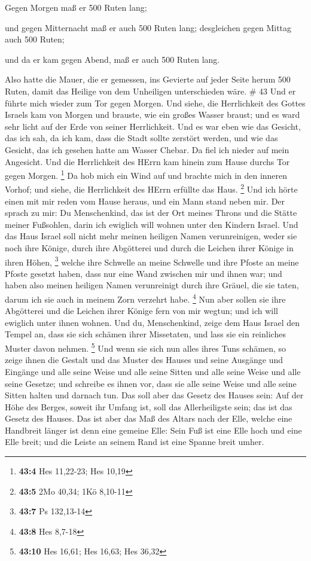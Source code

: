  Gegen Morgen maß er 500 Ruten lang;

 und gegen Mitternacht maß er auch 500 Ruten lang;
 desgleichen gegen Mittag auch 500 Ruten;

 und da er kam gegen Abend, maß er auch 500 Ruten lang.

 Also hatte die Mauer, die er gemessen, ins Gevierte auf
jeder Seite herum 500 Ruten, damit das Heilige von dem Unheiligen
unterschieden wäre. \# 43  Und er führte mich wieder zum Tor
gegen Morgen.  Und siehe, die Herrlichkeit des Gottes
Israels kam von Morgen und brauste, wie ein großes Wasser braust; und es
ward sehr licht auf der Erde von seiner Herrlichkeit.  Und
es war eben wie das Gesicht, das ich sah, da ich kam, dass die Stadt
sollte zerstört werden, und wie das Gesicht, das ich gesehen hatte am
Wasser Chebar. Da fiel ich nieder auf mein Angesicht.  Und
die Herrlichkeit des HErrn kam hinein zum Hause durchs Tor gegen Morgen.
\footnote{\textbf{43:4} Hes 11,22-23; Hes 10,19}  Da hob
mich ein Wind auf und brachte mich in den inneren Vorhof; und siehe, die
Herrlichkeit des HErrn erfüllte das Haus. \footnote{\textbf{43:5} 2Mo
  40,34; 1Kö 8,10-11}  Und ich hörte einen mit mir reden vom
Hause heraus, und ein Mann stand neben mir.  Der sprach zu
mir: Du Menschenkind, das ist der Ort meines Throns und die Stätte
meiner Fußsohlen, darin ich ewiglich will wohnen unter den Kindern
Israel. Und das Haus Israel soll nicht mehr meinen heiligen Namen
verunreinigen, weder sie noch ihre Könige, durch ihre Abgötterei und
durch die Leichen ihrer Könige in ihren Höhen, \footnote{\textbf{43:7}
  Ps 132,13-14}  welche ihre Schwelle an meine Schwelle und
ihre Pfoste an meine Pfoste gesetzt haben, dass nur eine Wand zwischen
mir und ihnen war; und haben also meinen heiligen Namen verunreinigt
durch ihre Gräuel, die sie taten, darum ich sie auch in meinem Zorn
verzehrt habe. \footnote{\textbf{43:8} Hes 8,7-18}  Nun aber
sollen sie ihre Abgötterei und die Leichen ihrer Könige fern von mir
wegtun; und ich will ewiglich unter ihnen wohnen.  Und du,
Menschenkind, zeige dem Haus Israel den Tempel an, dass sie sich schämen
ihrer Missetaten, und lass sie ein reinliches Muster davon nehmen.
\footnote{\textbf{43:10} Hes 16,61; Hes 16,63; Hes 36,32} 
Und wenn sie sich nun alles ihres Tuns schämen, so zeige ihnen die
Gestalt und das Muster des Hauses und seine Ausgänge und Eingänge und
alle seine Weise und alle seine Sitten und alle seine Weise und alle
seine Gesetze; und schreibe es ihnen vor, dass sie alle seine Weise und
alle seine Sitten halten und darnach tun.  Das soll aber
das Gesetz des Hauses sein: Auf der Höhe des Berges, soweit ihr Umfang
ist, soll das Allerheiligste sein; das ist das Gesetz des Hauses.
 Das ist aber das Maß des Altars nach der Elle, welche eine
Handbreit länger ist denn eine gemeine Elle: Sein Fuß ist eine Elle hoch
und eine Elle breit; und die Leiste an seinem Rand ist eine Spanne breit
umher.

